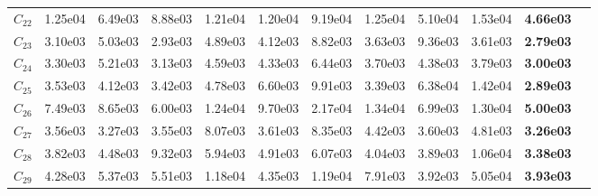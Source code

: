 \begin{table}[h]
\begin{center}
\begin{tabular}{p{0.3in} | p{0.44in} | p{0.4in} |  p{0.5in} |  p{0.4in}|  p{0.5in} |  p{0.4in} | p{0.4in} |  p{0.4in} | p{0.4in} |  p{0.4in} |  p{0.4in}}
$C_{22}$     &    1.25e04    &    6.49e03    &    8.88e03    &    1.21e04    &    1.20e04    &    9.19e04    &    1.25e04    &    5.10e04    &    1.53e04    &    \textbf{4.66e03 }\\
$C_{23}$     &    3.10e03    &    5.03e03    &    2.93e03    &    4.89e03    &    4.12e03    &    8.82e03    &    3.63e03    &    9.36e03    &    3.61e03    &    \textbf{2.79e03 }\\
$C_{24}$     &    3.30e03    &    5.21e03    &    3.13e03    &    4.59e03    &    4.33e03    &    6.44e03    &    3.70e03    &    4.38e03    &    3.79e03    &    \textbf{3.00e03 }\\
$C_{25}$     &    3.53e03    &    4.12e03    &    3.42e03    &    4.78e03    &    6.60e03    &    9.91e03    &    3.39e03    &    6.38e04    &    1.42e04    &    \textbf{2.89e03 }\\
$C_{26}$     &    7.49e03    &    8.65e03    &    6.00e03    &    1.24e04    &    9.70e03    &    2.17e04    &    1.34e04    &    6.99e03    &    1.30e04    &    \textbf{5.00e03 }\\
$C_{27}$     &    3.56e03    &    3.27e03    &    3.55e03    &    8.07e03    &    3.61e03    &    8.35e03    &    4.42e03    &    3.60e03    &    4.81e03    &    \textbf{3.26e03 }\\
$C_{28}$     &    3.82e03    &    4.48e03    &    9.32e03    &    5.94e03    &    4.91e03    &    6.07e03    &    4.04e03    &    3.89e03    &    1.06e04    &    \textbf{3.38e03 }\\
$C_{29}$     &    4.28e03    &    5.37e03    &    5.51e03    &    1.18e04    &    4.35e03    &    1.19e04    &    7.91e03    &    3.92e03    &    5.05e04    &    \textbf{3.93e03 }\\
\hline
\end{tabular}
\end{center}
\label{tab:mean3}
\end{table}





